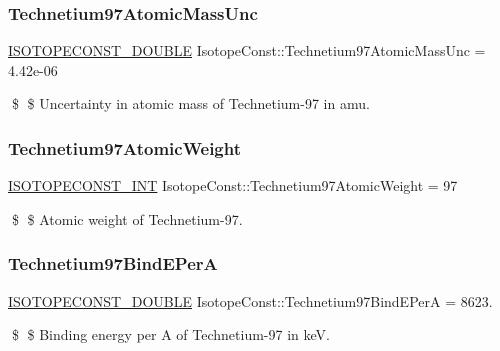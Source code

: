 \subsubsection{\texorpdfstring{Technetium97\+Atomic\+Mass\+Unc}{Technetium97AtomicMassUnc}}
{\footnotesize\ttfamily \mbox{\hyperlink{group___isotope_const-_macros_ga8f45a7272ce02c0b4c65c44636ed719a}{I\+S\+O\+T\+O\+P\+E\+C\+O\+N\+S\+T\+\_\+\+D\+O\+U\+B\+LE}} Isotope\+Const\+::\+Technetium97\+Atomic\+Mass\+Unc = 4.\+42e-\/06}

\$ \$ Uncertainty in atomic mass of Technetium-\/97 in amu. \mbox{\label{group___isotope_const-_technetium-_tc97_ga0dfbb258cd50ce878197c841f909594e}} 
\subsubsection{\texorpdfstring{Technetium97\+Atomic\+Weight}{Technetium97AtomicWeight}}
{\footnotesize\ttfamily \mbox{\hyperlink{group___isotope_const-_macros_ga5f18360b3e99483a35c32d789e62621c}{I\+S\+O\+T\+O\+P\+E\+C\+O\+N\+S\+T\+\_\+\+I\+NT}} Isotope\+Const\+::\+Technetium97\+Atomic\+Weight = 97}

\$ \$ Atomic weight of Technetium-\/97. \mbox{\label{group___isotope_const-_technetium-_tc97_gaf10f00a47e112435dac4ef8753b87d42}} 
\subsubsection{\texorpdfstring{Technetium97\+Bind\+E\+PerA}{Technetium97BindEPerA}}
{\footnotesize\ttfamily \mbox{\hyperlink{group___isotope_const-_macros_ga8f45a7272ce02c0b4c65c44636ed719a}{I\+S\+O\+T\+O\+P\+E\+C\+O\+N\+S\+T\+\_\+\+D\+O\+U\+B\+LE}} Isotope\+Const\+::\+Technetium97\+Bind\+E\+PerA = 8623.}

\$ \$ Binding energy per A of Technetium-\/97 in keV. \mbox{\label{group___isotope_const-_technetium-_tc97_ga9c1c401549ca933a95156206c5422714}} 
